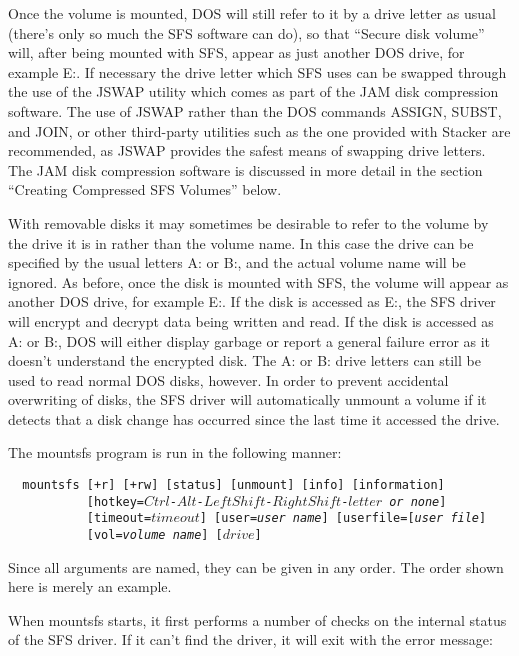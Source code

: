 Once the volume is mounted, DOS will still refer to it by a drive letter as
usual (there's only so much the SFS software can do), so that ``Secure disk
volume'' will, after being mounted with SFS, appear as just another DOS drive, 
for example E:.  If necessary the drive letter which SFS uses can be swapped
through the use of the JSWAP utility which comes as part of the JAM disk
compression software.  The use of JSWAP rather than the DOS commands ASSIGN,
SUBST, and JOIN, or other third-party utilities such as the one provided with
Stacker are recommended, as JSWAP provides the safest means of swapping drive
letters.  The JAM disk compression software is discussed in more detail in the
section ``Creating Compressed SFS Volumes'' below.

With removable disks it may sometimes be desirable to refer to the volume by
the drive it is in rather than the volume name.  In this case the drive can be
specified by the usual letters A: or B:, and the actual volume name will be
ignored.  As before, once the disk is mounted with SFS, the volume will appear
as another DOS drive, for example E:.  If the disk is accessed as E:, the SFS
driver will encrypt and decrypt data being written and read.  If the disk is
accessed as A: or B:, DOS will either display garbage or report a general
failure error as it doesn't understand the encrypted disk. The A: or B: drive
letters can still be used to read normal DOS disks, however.  In order to
prevent accidental overwriting of disks, the SFS driver will automatically
unmount a volume if it detects that a disk change has occurred since the last
time it accessed the drive.

The mountsfs program is run in the following manner:


{\tt \verb|  |mountsfs [+r] [+rw] [status] [unmount] [info] [information]\\
\verb|           |[hotkey=$Ctrl$-$Alt$-$LeftShift$-$RightShift$-$letter$ {\em or none}]\\
\verb|           |[timeout=$timeout$] [user={\em user name}] [userfile=[{\em user file}]\\
\verb|           |[vol={\em volume name}] [$drive$]}

Since all arguments are named, they can be given in any order.  The order shown
here is merely an example.

When mountsfs starts, it first performs a number of checks on the internal
status of the SFS driver.  If it can't find the driver, it will exit with the
error message:

